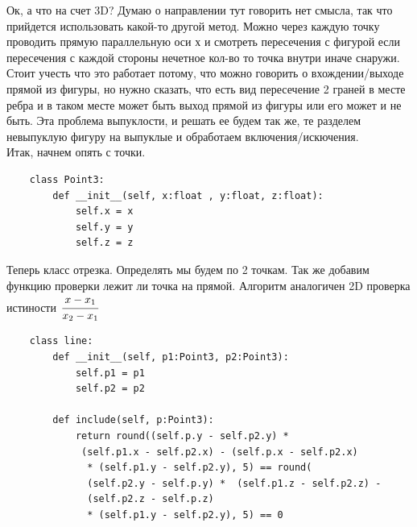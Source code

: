 \documentclass[12pt]{article} %
\begin{document}
 	\hspace*{1cm}Ок, а что на счет 3D? Думаю о направлении тут говорить нет смысла, так что прийдется использовать какой-то другой метод. Можно через каждую точку проводить прямую параллельную оси х и смотреть пересечения с фигурой если пересечения с каждой стороны нечетное кол-во то точка внутри иначе снаружи. Стоит учесть что это работает потому, что можно говорить о вхождении/выходе прямой из фигуры, но нужно сказать, что есть вид пересечение 2 граней в месте ребра и в таком месте может быть выход прямой из фигуры или его может и не быть. Эта проблема выпуклости, и решать ее будем так же, те разделем невыпуклую фигуру на выпуклые и обработаем включения/искючения.\\
 	\hspace*{1cm}Итак, начнем опять с точки.
 	\begin{verbatim}
 	class Point3:
 	    def __init__(self, x:float , y:float, z:float):
 	        self.x = x
 	        self.y = y
 	        self.z = z
 	\end{verbatim}
 	\hspace*{1cm}Теперь класс отрезка. Определять мы будем по 2 точкам. Так же добавим функцию проверки лежит ли точка на прямой. Алгоритм аналогичен 2D проверка истиности $\cfrac{x - x_1}{x_2 - x_1}$
 	\begin{verbatim}
 	class line:
 	    def __init__(self, p1:Point3, p2:Point3):
 	        self.p1 = p1
 	        self.p2 = p2
 	    
 	    def include(self, p:Point3):
 	        return round((self.p.y - self.p2.y) *
 	         (self.p1.x - self.p2.x) - (self.p.x - self.p2.x)
 	          * (self.p1.y - self.p2.y), 5) == round(
 	          (self.p2.y - self.p.y) *  (self.p1.z - self.p2.z) - 
 	          (self.p2.z - self.p.z)
 	          * (self.p1.y - self.p2.y), 5) == 0
 	       
    \end{verbatim}
\end{document}
